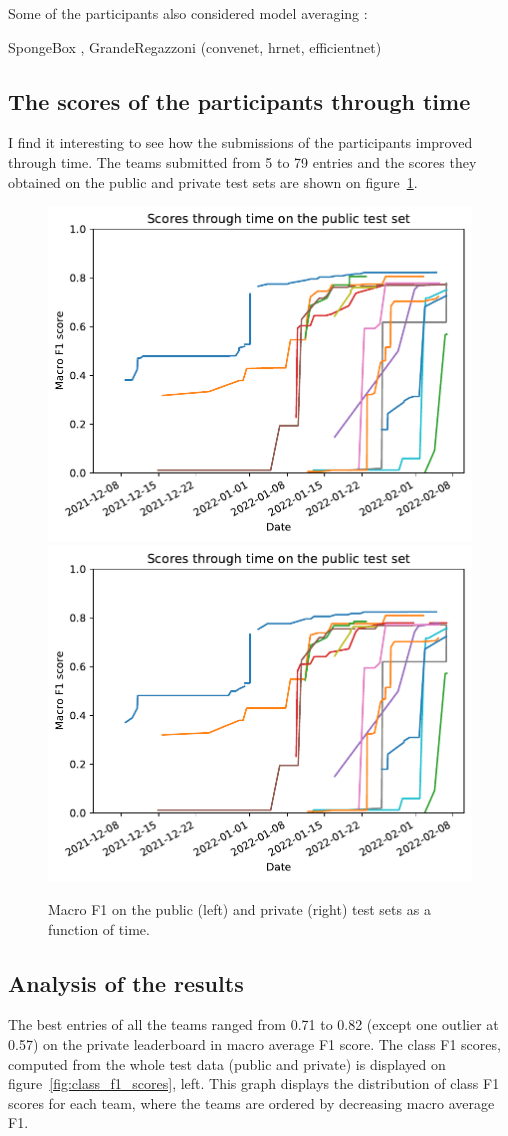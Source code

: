 \documentclass{article}
\begin{document}
Some of the participants also considered model averaging :

SpongeBox , GrandeRegazzoni (convenet, hrnet, efficientnet)


\subsection{The scores of the participants through time}

I find it interesting to see how the submissions of the participants improved through time. The teams submitted from 5 to 79 entries and the scores they obtained on the public and private test sets are shown on figure~\ref{fig:F1scores}.

\begin{figure}
	\begin{center}
		\includegraphics[width=0.45\columnwidth]{figs/public-test.pdf}
		\includegraphics[width=0.45\columnwidth]{figs/private-test.pdf}
	\end{center}
	\caption{\label{fig:F1scores} Macro F1 on the public (left) and private (right) test sets as a function of time.}
\end{figure}

\subsection{Analysis of the results}

The best entries of all the teams ranged from 0.71 to 0.82 (except one outlier at 0.57) on the private leaderboard in macro average F1 score. The class F1 scores, computed from the whole test data (public and private) is displayed on figure~\ref{fig:class_f1_scores}, left. This graph displays the distribution of class F1 scores for each team, where the teams are ordered by decreasing macro average F1.
\end{document}

